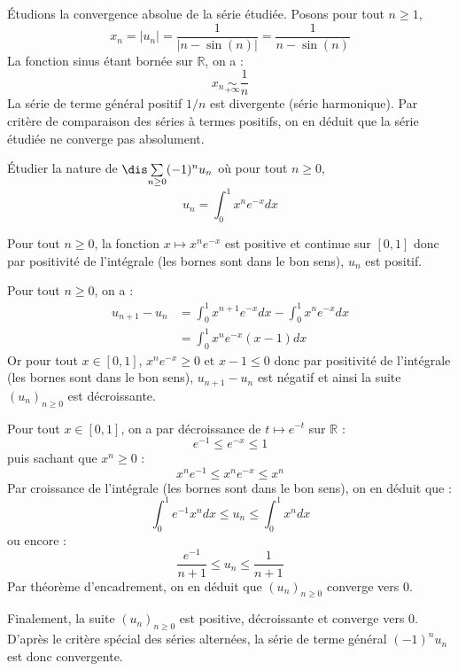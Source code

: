 \documentclass[a4paper,10pt]{report}
\newcommand{\Sum}[2]{\ensuremath{\textstyle{\sum\limits_{#1}^{#2}}}}
\begin{document}
\medskip

\noindent Étudions la convergence absolue de la série étudiée. Posons pour tout $n \geq 1$,
$$ x_n = \vert u_n \vert = \dfrac{1}{\vert n - \sin(n) \vert} = \dfrac{1}{n- \sin(n)}$$
La fonction sinus étant bornée sur $\mathbb{R}$, on a :
$$ x_n \underset{+ \infty}{\sim} \dfrac{1}{n}$$
La série de terme général positif $1/n$ est divergente (série harmonique). Par critère de comparaison des séries à termes positifs, on en déduit que la série étudiée ne converge pas absolument.

\medskip

\begin{Exa} Étudier la nature de $\dis \Sum{n \geq 0}{} (-1)^n u_n$ où pour tout $n \geq 0$,
\vspace{-0.4cm}
$$ u_n = \int_{0}^1 x^n e^{-x} dx$$
\end{Exa}

\corr Pour tout $n \geq 0$, la fonction $x \mapsto x^n e^{-x}$ est positive et continue sur $[0,1]$ donc par positivité de l'intégrale (les bornes sont dans le bon sens), $u_n$ est positif.

\medskip

\noindent Pour tout $n \geq 0$, on a :
\begin{align*}
u_{n+1}-u_n & = \int_{0}^1 x^{n+1} e^{-x} dx - \int_{0}^1 x^{n} e^{-x} dx \\
& =\int_{0}^1 x^n e^{-x} (x-1) dx
\end{align*}
Or pour tout $x \in [0,1]$, $x^n e^{-x} \geq 0$ et $x-1 \leq 0$ donc par positivité de l'intégrale (les bornes sont dans le bon sens), $u_{n+1}-u_n$ est négatif et ainsi la suite $(u_n)_{n \geq 0}$ est décroissante.

\medskip

\noindent Pour tout $x \in [0,1]$, on a par décroissance de $t \mapsto e^{-t}$ sur $\mathbb{R}$ :
$$e^{-1} \leq e^{-x} \leq 1$$
puis sachant que $x^n \geq 0$ :
$$ x^n e^{-1} \leq x^n e^{-x} \leq x^n $$
Par croissance de l'intégrale (les bornes sont dans le bon sens), on en déduit que :
$$ \int_{0}^1 e^{-1}x^n dx \leq u_n \leq \int_{0}^1 x^n dx$$
ou encore :
$$ \frac{e^{-1}}{n+1} \leq u_n \leq \frac{1}{n+1}$$
Par théorème d'encadrement, on en déduit que $(u_n)_{n \geq 0}$ converge vers $0$.

\medskip

\noindent Finalement, la suite $(u_n)_{n \geq 0}$ est positive, décroissante et converge vers $0$. D'après le critère spécial des séries alternées, la série de terme général $(-1)^n u_n$ est donc convergente. 
\end{document}

